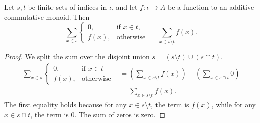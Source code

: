 \begin{lemma}\label{lem:sum_ite_not_mem}
    \leanok
    Let $s, t$ be finite sets of indices in $\iota$, and let $f \colon \iota \to A$ be a function to an additive commutative monoid. Then
    \[
    \sum_{x \in s} 
    \begin{cases}
    0, & \text{if } x \in t, \\
    f(x), & \text{otherwise}
    \end{cases}
    =
    \sum_{x \in s \setminus t} f(x).
    \]
\end{lemma}
\begin{proof}
    We split the sum over the disjoint union $s = (s \setminus t) \cup (s \cap t)$.
    \begin{align*}
    \sum_{x \in s} 
    \begin{cases}
    0, & \text{if } x \in t \\
    f(x), & \text{otherwise}
    \end{cases}
    &=
    \left( \sum_{x \in s \setminus t} f(x) \right)
    +
    \left( \sum_{x \in s \cap t} 0 \right) \\
    &= \sum_{x \in s \setminus t} f(x).
    \end{align*}
    The first equality holds because for any $x \in s \setminus t$, the term is $f(x)$, while for any $x \in s \cap t$, the term is $0$. 
    The sum of zeros is zero.
\end{proof}